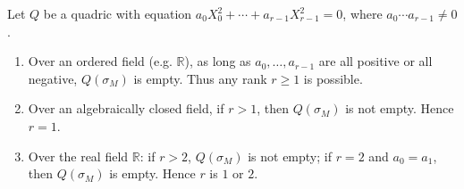 Let $Q$ be a quadric with equation $a_0 X_0^2 + \cdots + a_{r-1} X_{r-1}^2 = 0$, where $a_0 \cdots a_{r-1} \neq 0$.

\begin{enumerate}
\item[(i)] Over an ordered field (e.g. $\mathbb{R}$), as long as $a_0, \ldots, a_{r-1}$ are all positive or all negative, $Q(\sigma_M)$ is empty. Thus any rank $r \geq 1$ is possible.
\item[(ii)] Over an algebraically closed field, if $r > 1$, then $Q(\sigma_M)$ is not empty. Hence $r = 1$.
\item[(iii)] Over the real field $\mathbb{R}$: if $r > 2$, $Q(\sigma_M)$ is not empty; if $r = 2$ and $a_0 = a_1$, then $Q(\sigma_M)$ is empty. Hence $r$ is $1$ or $2$.
\end{enumerate}
